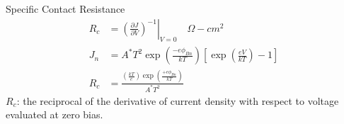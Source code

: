 \documentclass[a4paper, twocolumn]{article}
\begin{document}
    \par Specific Contact Resistance \\
    \begin{equation*}
        \begin{aligned}
            R_c &= \left. \left( \frac{\partial J}{\partial V}  \right)^{-1} \right|_{V = 0} \quad \Omega-cm^{2}  \\
            J_n &= A^* T^2 \exp \left( \frac{-e \phi_{Bn}}{kT}  \right) \left[ \exp \left( \frac{eV}{kT}  \right) - 1 \right] \\
            R_c &= \frac{\left(\frac{kT}{e} \right) \exp \left( \frac{+e \phi_{Bn} }{kT}  \right)}{A^* T^2} 
        \end{aligned}
    \end{equation*}
    $R_c$: the reciprocal of the derivative of current density with respect to voltage evaluated at zero bias.
    \newpage
    \textcolor{white}{a}
    
    
% 
% 
% 
    
\end{document}
